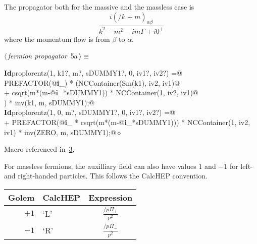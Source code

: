 \documentclass[a4paper,12pt]{amsart}
\newcommand{\fmslash}[1]{\ensuremath{/\!\!\!{#1}}}
\newcommand{\pslash}[1][{}]{\fmslash{p}_{#1}}
\newcommand{\kslash}[1][{}]{\fmslash{k}_{#1}}
\renewcommand{\NWtarget}[2]{\hypertarget{#1}{#2}}
\renewcommand{\NWlink}[2]{\hyperlink{#1}{#2}}
\renewcommand{\NWtxtMacroRefIn}{Macro referenced in}
\renewcommand{\NWsep}{${\diamond}$}
\begin{document}
The propagator both for the massive and the massless case is
\begin{equation}
\frac{i(\kslash + m)_{\alpha\beta}}{k^2-m^2-im\Gamma+i0^+}
\end{equation}
where the momentum flow is from $\beta$ to $\alpha$.
\begin{flushleft} \small
\begin{minipage}{\linewidth}\label{scrap6}\raggedright\small
\NWtarget{nuweb5a}{} $\langle\,${\itshape fermion propagator}\nobreak\ {\footnotesize {5a}}$\,\rangle\equiv$
\vspace{-1ex}
\begin{list}{}{} \item
\mbox{}\verb@@\hbox{\sffamily\bfseries Id}\verb@ proplorentz(1, k1?, m?, sDUMMY1?, 0, iv1?, iv2?) =@\\
\mbox{}\verb@  PREFACTOR(@\hbox{\sffamily\bfseries i}\verb@_) * (NCContainer(Sm(k1), iv2, iv1)@\\
\mbox{}\verb@   + csqrt(m*(m-@\hbox{\sffamily\bfseries i}\verb@_*sDUMMY1)) * NCContainer(1, iv2, iv1)@\\
\mbox{}\verb@  ) * inv(k1, m, sDUMMY1);@\\
\mbox{}\verb@@\hbox{\sffamily\bfseries Id}\verb@ proplorentz(1, 0, m?, sDUMMY1?, 0, iv1?, iv2?) =@\\
\mbox{}\verb@   + PREFACTOR(@\hbox{\sffamily\bfseries i}\verb@_ * csqrt(m*(m-@\hbox{\sffamily\bfseries i}\verb@_*sDUMMY1))) * NCContainer(1, iv2, iv1) * inv(ZERO, m, sDUMMY1);@{\NWsep}
\end{list}
\vspace{-1.5ex}
\footnotesize
\begin{list}{}{\setlength{\itemsep}{-\parsep}\setlength{\itemindent}{-\leftmargin}}
\item \NWtxtMacroRefIn\ \NWlink{nuweb3}{3}.

\item{}
\end{list}
\end{minipage}\vspace{4ex}
\end{flushleft}
For massless fermions,
the auxilliary field can also have values $1$ and $-1$ for
left- and right-handed particles. This follows the CalcHEP convention.
\begin{center}
\begin{tabular}{rlc}
Golem & CalcHEP & Expression\\
\hline
$+1$ & `L' & $\frac{\pslash\Pi_+}{p^2}$ \\
$-1$ & `R' & $\frac{\pslash\Pi_-}{p^2}$
\end{tabular}
\end{center}
\end{document}
